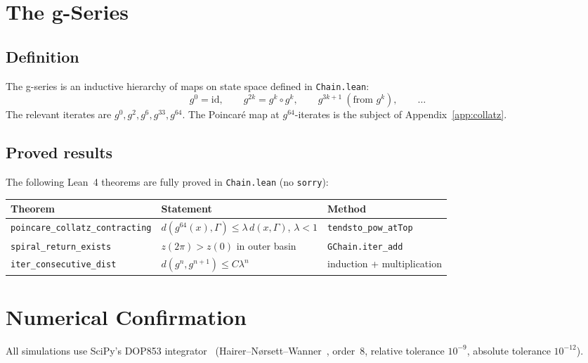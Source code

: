 \documentclass[12pt]{amsart}
\theoremstyle{definition}
\theoremstyle{remark}
\newcommand{\lean}[1]{\texttt{#1}}
\begin{document}
\section{The g-Series}\label{sec:gseries}

\subsection{Definition}

The g-series is an inductive hierarchy of maps on state space
defined in \texttt{Chain.lean}:
\begin{equation}\label{eq:gseries}
  g^0 = \mathrm{id},\qquad
  g^{2k} = g^k\circ g^k,\qquad
  g^{3k+1}\ (\text{from }g^k),\qquad \ldots
\end{equation}
The relevant iterates are $g^0, g^2, g^6, g^{33}, g^{64}$.
The Poincar\'{e} map at $g^{64}$-iterates is the subject of
Appendix~\ref{app:collatz}.

\subsection{Proved results}

The following Lean~4 theorems are fully proved in
\texttt{Chain.lean} (no \lean{sorry}):

\begin{center}
\begin{tabular}{lll}
\toprule
Theorem & Statement & Method \\
\midrule
\lean{poincare\_collatz\_contracting}
  & $d(g^{64}(x),\Gamma)\le\lambda\,d(x,\Gamma)$, $\lambda<1$
  & \lean{tendsto\_pow\_atTop} \\
\lean{spiral\_return\_exists}
  & $z(2\pi)>z(0)$ in outer basin
  & \lean{GChain.iter\_add} \\
\lean{iter\_consecutive\_dist}
  & $d(g^n,g^{n+1})\le C\lambda^n$
  & induction + multiplication \\
\bottomrule
\end{tabular}
\end{center}

\section{Numerical Confirmation}\label{sec:numerics}

All simulations use SciPy's DOP853 integrator~\cite{SciPy2020}
(Hairer--N\o rsett--Wanner~\cite{HairerNW1993}, order~8,
relative tolerance $10^{-9}$, absolute tolerance $10^{-12}$).
\end{document}
